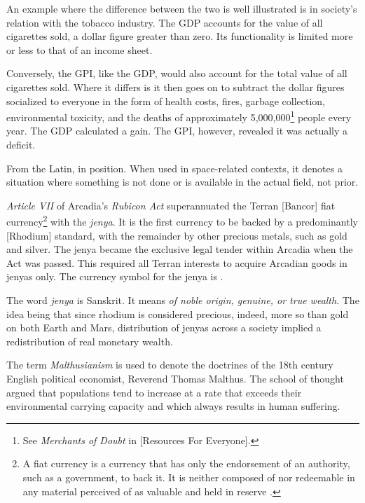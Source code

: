 An example where the difference between the two is well illustrated is in society's relation with the tobacco industry. The GDP accounts for the value of all cigarettes sold, a dollar figure greater than zero. Its functionality is limited more or less to that of an income sheet.

Conversely, the GPI, like the GDP, would also account for the total value of all cigarettes sold. Where it differs is it then goes on to subtract the dollar figures socialized to everyone in the form of health costs, fires, garbage collection, environmental toxicity, and the deaths of approximately 5,000,000\footnote{See {\it Merchants of Doubt} in [Resources For Everyone].} people every year. The GDP calculated a gain. The GPI, however, revealed it was actually a deficit.

From the Latin, in position. When used in space-related contexts, it denotes a situation where something is not done or is available in the actual field, not prior.

{\it Article VII} of Arcadia's {\it Rubicon Act} superannuated the Terran [Bancor] fiat currency\footnote{A fiat currency is a currency that has only the endorsement of an authority, such as a government, to back it. It is neither composed of nor redeemable in any material perceived of as valuable and held in reserve .} with the {\it jenya}. It is the first currency to be backed by a predominantly [Rhodium] standard, with the remainder by other precious metals, such as gold and silver. The jenya became the exclusive legal tender within Arcadia when the Act was passed. This required all Terran interests to acquire Arcadian goods in jenyas only. The currency symbol for the jenya is .

    {}

The word {\it jenya} is Sanskrit. It means {\it of noble origin, genuine, or true wealth}. The idea being that since rhodium is considered precious, indeed, more so than gold on both Earth and Mars, distribution of jenyas across a society implied a redistribution of real monetary wealth.

The term {\it Malthusianism} is used to denote the doctrines of the 18th century English political economist, Reverend Thomas Malthus. The school of thought argued that populations tend to increase at a rate that exceeds their environmental carrying capacity and which always results in human suffering. 

